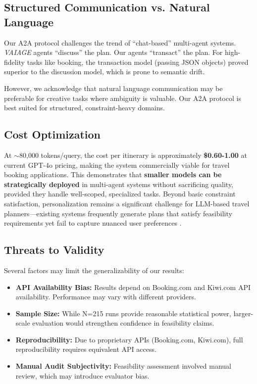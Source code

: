 \documentclass[conference]{IEEEtran}
\begin{document}
\subsection{Structured Communication vs. Natural Language}
Our A2A protocol challenges the trend of ``chat-based'' multi-agent systems. \textit{VAIAGE} agents ``discuss'' the plan. Our agents ``transact'' the plan. For high-fidelity tasks like booking, the transaction model (passing JSON objects) proved superior to the discussion model, which is prone to semantic drift.

However, we acknowledge that natural language communication may be preferable for creative tasks where ambiguity is valuable. Our A2A protocol is best suited for structured, constraint-heavy domains.

\subsection{Cost Optimization}
At $\sim$80,000 tokens/query, the cost per itinerary is approximately \textbf{\$0.60-1.00} at current GPT-4o pricing, making the system commercially viable for travel booking applications. This demonstrates that \textbf{smaller models can be strategically deployed} in multi-agent systems without sacrificing quality, provided they handle well-scoped, specialized tasks. Beyond basic constraint satisfaction, personalization remains a significant challenge for LLM-based travel planners---existing systems frequently generate plans that satisfy feasibility requirements yet fail to capture nuanced user preferences \cite{shen2025triptailor, dhote2025smart}.

\subsection{Threats to Validity}
Several factors may limit the generalizability of our results:
\begin{itemize}
    \item \textbf{API Availability Bias:} Results depend on Booking.com and Kiwi.com API availability. Performance may vary with different providers.
    \item \textbf{Sample Size:} While N=215 runs provide reasonable statistical power, larger-scale evaluation would strengthen confidence in feasibility claims.
    \item \textbf{Reproducibility:} Due to proprietary APIs (Booking.com, Kiwi.com), full reproducibility requires equivalent API access.
    \item \textbf{Manual Audit Subjectivity:} Feasibility assessment involved manual review, which may introduce evaluator bias.
\end{itemize}
\end{document}
